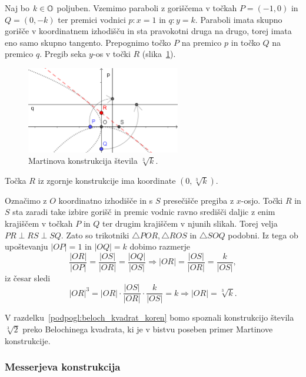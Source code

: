 Naj bo $k \in \mathbb O$ poljuben. Vzemimo paraboli z goriščema v točkah $P = (-1, 0)$ in $Q = (0, -k)$ ter premici vodnici $p: x = 1$ in $q: y = k$. Paraboli imata skupno gorišče v koordinatnem izhodišču in sta pravokotni druga na drugo, torej imata eno samo skupno tangento. Prepognimo točko $P$ na premico $p$ in točko $Q$ na premico $q$. Pregib seka $y$-os v točki $R$ (slika~\ref{fig:martin}).
\begin{figure}[h]
    \centering
    \includegraphics[width=0.6\textwidth]{images/starogr_problemi/cube_martin.png}
    \caption[Martinova konstrukcija kubičnega korena]{Martinova konstrukcija števila $\sqrt[3]{k}$.}
    \label{fig:martin}
\end{figure}
\begin{trditev}
    Točka $R$ iz zgornje konstrukcije ima koordinate $(0, \sqrt[3]{k})$.
\end{trditev}
\begin{dokaz}
    Označimo z $O$ koordinatno izhodišče in s $S$ presečišče pregiba z $x$-osjo. Točki $R$ in $S$ sta zaradi take izbire gorišč in premic vodnic ravno središči daljic z enim krajiščem v točkah $P$ in $Q$ ter drugim krajiščem v njunih slikah. Torej velja $PR \perp RS \perp SQ$. Zato so trikotniki $\triangle POR, \triangle ROS$ in $\triangle SOQ$ podobni. Iz tega ob upoštevanju $|OP| = 1$ in $|OQ| = k$ dobimo razmerje
    $$ \frac{|OR|}{|OP|} = \frac{|OS|}{|OR|} = \frac{|OQ|}{|OS|} \Longrightarrow |OR| = \frac{|OS|}{|OR|} = \frac{k}{|OS|}, $$
    iz česar sledi
    $$ |OR|^3 = |OR| \cdot \frac{|OS|}{|OR|} \cdot \frac{k}{|OS|} = k \Longrightarrow |OR| = \sqrt[3]{k}.$$
\end{dokaz}
\begin{opomba}
    V razdelku~\ref{podpogl:beloch_kvadrat_koren} bomo spoznali konstrukcijo števila $\sqrt[3]{2}$ preko Belochinega kvadrata, ki je v bistvu poseben primer Martinove konstrukcije.
\end{opomba}

\subsubsection*{Messerjeva konstrukcija}

